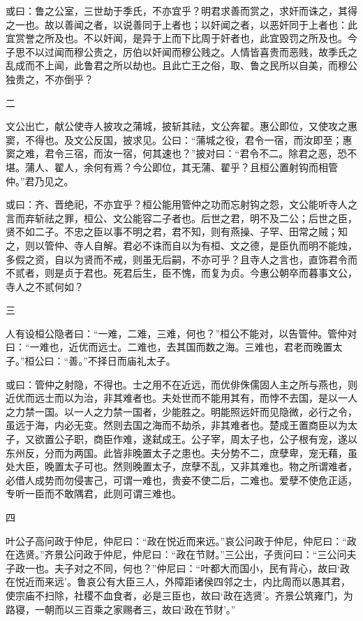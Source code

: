 \documentclass[]{article}
\begin{document}
或曰：鲁之公室，三世劫于季氏，不亦宜乎？明君求善而赏之，求奸而诛之，其得之一也。故以善闻之者，以说善同于上者也；以奸闻之者，以恶奸同于上者也：此宜赏誉之所及也。不以奸闻，是异于上而下比周于奸者也，此宜毁罚之所及也。今子思不以过闻而穆公贵之，厉伯以奸闻而穆公贱之。人情皆喜贵而恶贱，故季氏之乱成而不上闻，此鲁君之所以劫也。且此亡王之俗，取、鲁之民所以自美，而穆公独贵之，不亦倒乎？

二

文公出亡，献公使寺人披攻之蒲城，披斩其祛，文公奔翟。惠公即位，又使攻之惠窦，不得也。及文公反国，披求见。公曰：``蒲城之役，君令一宿，而汝即至；惠窦之难，君令三宿，而汝一宿，何其速也？''披对曰：``君令不二。除君之恶，恐不堪。蒲人、翟人，余何有焉？今公即位，其无蒲、翟乎？且桓公置射钩而相管仲。''君乃见之。

或曰：齐、晋绝祀，不亦宜乎？桓公能用管仲之功而忘射钩之怨，文公能听寺人之言而弃斩祛之罪，桓公、文公能容二子者也。后世之君，明不及二公；后世之臣，贤不如二子。不忠之臣以事不明之君，君不知，则有燕操、子罕、田常之贼；知之，则以管仲、寺人自解。君必不诛而自以为有桓、文之德，是臣仇而明不能烛，多假之资，自以为贤而不戒，则虽无后嗣，不亦可乎？且寺人之言也，直饰君令而不贰者，则是贞于君也。死君后生，臣不愧，而复为贞。今惠公朝卒而暮事文公，寺人之不贰何如？

三

人有设桓公隐者曰：``一难，二难，三难，何也？''桓公不能对，以告管仲。管仲对曰：``一难也，近优而远士。二难也，去其国而数之海。三难也，君老而晚置太子。''桓公曰：``善。''不择日而庙礼太子。

或曰：管仲之射隐，不得也。士之用不在近远，而优俳侏儒固人主之所与燕也，则近优而远士而以为治，非其难者也。夫处世而不能用其有，而悖不去国，是以一人之力禁一国。以一人之力禁一国者，少能胜之。明能照远奸而见隐微，必行之令，虽远于海，内必无变。然则去国之海而不劫杀，非其难者也。楚成王置商臣以为太子，又欲置公子职，商臣作难，遂弑成王。公子宰，周太子也，公子根有宠，遂以东州反，分而为两国。此皆非晚置太子之患也。夫分势不二，庶孽卑，宠无藉，虽处大臣，晚置太子可也。然则晚置太子，庶孽不乱，又非其难也。物之所谓难者，必借人成势而勿侵害己，可谓一难也，贵妾不使二后，二难也。爱孽不使危正适，专听一臣而不敢隅君，此则可谓三难也。

四

叶公子高问政于仲尼，仲尼曰：``政在悦近而来远。''哀公问政于仲尼，仲尼曰：``政在选贤。''齐景公问政于仲尼，仲尼曰：``政在节财。''三公出，子贡问曰：``三公问夫子政一也。夫子对之不同，何也？''仲尼曰：``叶都大而国小，民有背心，故曰`政在悦近而来远'。鲁哀公有大臣三人，外障距诸侯四邻之士，内比周而以愚其君，使宗庙不扫除，社稷不血食者，必是三臣也，故曰`政在选贤'。齐景公筑雍门，为路寝，一朝而以三百乘之家赐者三，故曰`政在节财'。''
\end{document}
